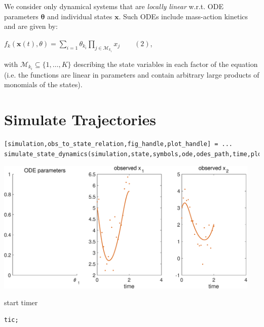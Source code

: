 \begin{par}
We consider only dynamical systems that are \textit{locally linear} w.r.t. ODE parameters $\boldsymbol\theta$ and individual states $\mathbf{x}$. Such ODEs include mass-action kinetics and are given by:
\end{par} \vspace{1em}
\begin{par}
$f_{k}(\mathbf{x}(t),\theta) = \sum_{i=1} \theta_{k_i} \prod_{j \in\mathcal{M}_{k_i}} x_j \qquad (2)$,
\end{par} \vspace{1em}

\noindent with $\mathcal{M}_{k_i} \subseteq \{ 1, \dots, K\}$ describing the state variables in each factor of the equation (i.e. the functions are linear in parameters and contain arbitrary large products of monomials of the states).



\section{Simulate Trajectories}

\color{RoyalPurple}\begin{verbatim}
[simulation,obs_to_state_relation,fig_handle,plot_handle] = ...
simulate_state_dynamics(simulation,state,symbols,ode,odes_path,time,plot_settings);
\end{verbatim}
\color{black}

{\centering
\includegraphics [width=5in]{VGM_for_Lotka_Volterra_01.eps}

}
\begin{par}
start timer
\end{par} \vspace{1em}
\color{RoyalPurple}\begin{verbatim}
tic;
\end{verbatim}
\color{black}



